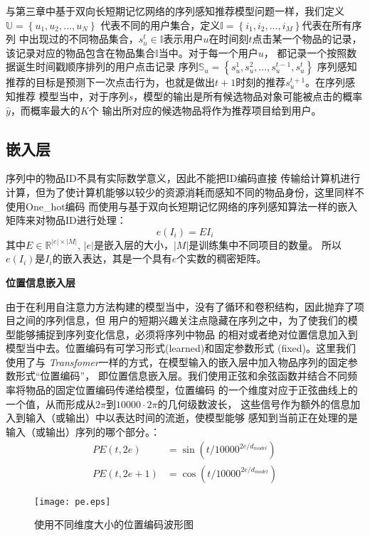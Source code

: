 与第三章中基于双向长短期记忆网络的序列感知推荐模型问题一样，我们定义$\mathbb{U}= \left \{ u_{1},u_{2},...,u_{N} \right \}\label{eq}$%
代表不同的用户集合，定义$\mathbb{I}= \left \{ i_{1},i_{2},...,i_{M} \right \}$代表在所有序列%
中出现过的不同物品集合，$s_{u}^{t}\in \mathbb{I}$表示用户$u$在时间刻$t$点击某一个物品的记录，%
该记录对应的物品包含在物品集合$\mathbb{I}$当中。对于每一个用户$u$，%
都记录一个按照数据诞生时间戳顺序排列的用户点击记录%
序列$\mathbb{S}_{u}=\left \{ s_{u}^{1},s_{u}^{2},...,s_{u}^{t-1},s_{u}^{t} \right \}$%
序列感知推荐的目标是预测下一次点击行为，也就是做出$t+1$时刻的推荐$s_{u}^{t+1}$。在序列感知推荐%
模型当中，对于序列$s$，模型的输出是所有候选物品对象可能被点击的概率$\hat{y}$，而概率最大的$K$个%
输出所对应的候选物品将作为推荐项目给到用户。%

\subsection{嵌入层}

序列中的物品ID不具有实际数学意义，因此不能把ID编码直接%
传输给计算机进行计算，但为了使计算机能够以较少的资源消耗而感知不同的物品身份，这里同样不使用One\_hot编码%
而使用与基于双向长短期记忆网络的序列感知算法一样的嵌入矩阵来对物品ID进行处理：
$$
e(I_i) = EI_i
$$
其中$E\in \mathbb{R}^{|e|\times |M|}$, $|e|$是嵌入层的大小，$|M|$是训练集中不同项目的数量。%
所以$e(I_i)$是$I_i$的嵌入表达，其是一个具有$e$个实数的稠密矩阵。

\textbf{位置信息嵌入层}

由于在利用自注意力方法构建的模型当中，没有了循环和卷积结构，因此抛弃了项目之间的序列信息，但%
用户的短期兴趣关注点隐藏在序列之中，为了使我们的模型能够捕捉到序列变化信息，必须将序列中物品%
的相对或者绝对位置信息加入到模型当中去。位置编码有可学习形式(learned)和固定参数形式%
(fixed)。这里我们使用了与%
\textit{Transfomer}一样的方式，在模型输入的嵌入层中加入物品序列的固定参数形式“位置编码”，%
即位置信息嵌入层。我们使用正弦和余弦函数并结合不同频率将物品的固定位置编码传递给模型，位置编码%
的一个维度对应于正弦曲线上的一个值，从而形成从$2\pi $到$10000 \cdot  2\pi$的几何级数波长，%
这些信号作为额外的信息加入到输入（或输出）中以表达时间的流逝，使模型能够%
感知到当前正在处理的是输入（或输出）序列的哪个部分。：
\begin{align}
  PE(t,2e) &= \sin (t/10000^{2e/d_{model}}) \label{eq:sin}\\
  PE(t,2e+1) &= \cos (t/10000^{2e/d_{model}}) \label{con}
\end{align}
\begin{figure}
\centering
\texttt{[image: pe.eps]}
\caption{使用不同维度大小的位置编码波形图}
\label{pe}
\end{figure}

